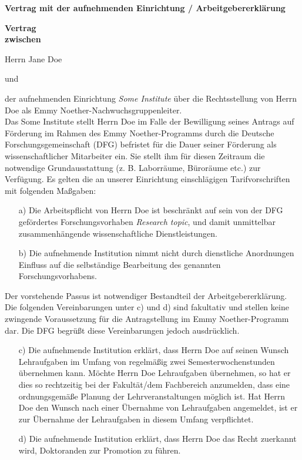 \documentclass[a4paper,10pt,ngerman,numbers=noenddot]{scrreprt}
\newcommand{\firstname}{Jane\xspace}
\newcommand{\lastname}{Doe\xspace}
\newcommand{\institute}{Some Institute\xspace}
\newcommand{\institutearticle}{Das\xspace}
\newcommand{\topic}{Research topic\xspace}
\newcommand{\herrnfrau}{Herrn\xspace}
\newcommand{\seinihr}{sein\xspace}
\newcommand{\ersie}{er\xspace}
\newcommand{\ihmihr}{ihm\xspace}
\newcommand{\employee}{wissenschaftlicher Mitarbeiter\xspace}
\newcommand{\inending}{}
\newcommand{\seinesihres}{seines\xspace}
\newcommand{\seinenihren}{seinen\xspace}
\newcommand{\seinerihrer}{seiner\xspace}
\newcommand{\herrnfrau}{Frau\xspace}
\newcommand{\seinihr}{ihr\xspace}
\newcommand{\ersie}{sie\xspace}
\newcommand{\ihmihr}{ihr\xspace}
\newcommand{\employee}{wissenschaftliche Mitarbeiterin\xspace}
\newcommand{\inending}{in}
\newcommand{\seinesihres}{ihres\xspace}
\newcommand{\seinenihren}{ihren\xspace}
\newcommand{\seinerihrer}{ihrer\xspace}
\begin{document}
\thispagestyle{empty}
\textbf{Vertrag mit der aufnehmenden Einrichtung / Arbeitgebererklärung}\\[0.5cm]

\begin{center}
\bf
Vertrag\\
zwischen
\end{center}

\herrnfrau \firstname \lastname \\

\begin{center}
und\\
\end{center}


der aufnehmenden Einrichtung \emph{\institute} über die Rechtsstellung von \herrnfrau \lastname als Emmy Noether-Nachwuchsgruppenleiter\inending.\\

\institutearticle \institute stellt \herrnfrau \lastname im Falle der Bewilligung \seinesihres Antrags auf Förderung im Rahmen des Emmy Noether-Programms durch die Deutsche Forschungsgemeinschaft (DFG) befristet für die Dauer \seinerihrer Förderung als \employee ein. Sie stellt \ihmihr für diesen Zeitraum die notwendige Grundausstattung (z. B. Laborräume, Büroräume etc.) zur Verfügung. Es gelten die an unserer Einrichtung einschlägigen Tarifvorschriften mit folgenden Maßgaben:

\begin{itemize}
\item[a)]	Die Arbeitspflicht von \herrnfrau \lastname ist beschränkt auf \seinihr von der DFG gefördertes Forschungsvorhaben \emph{\topic}, und damit unmittelbar zu\-sammen\-hängende wissenschaftliche Dienstleistungen.
\item[b)]	Die aufnehmende Institution nimmt nicht durch dienstliche Anordnungen Einfluss auf die selb\-ständige Bearbeitung des genannten Forschungsvorhabens.
\end{itemize}

Der vorstehende Passus ist notwendiger Bestandteil der Arbeitgebererklärung.
Die folgenden Vereinbarungen unter c) und d) sind fakultativ und stellen keine zwingende Voraussetzung für die Antragstellung im Emmy Noether-Programm dar. Die DFG begrüßt diese Vereinbarungen jedoch ausdrücklich.

\begin{itemize}
\item[c)]	Die aufnehmende Institution erklärt, dass \herrnfrau \lastname auf \seinenihren Wunsch Lehraufgaben im Umfang von regelmäßig zwei Semesterwochenstunden übernehmen kann. Möchte \herrnfrau \lastname Lehraufgaben übernehmen, so hat \ersie dies so rechtzeitig bei der Fakultät/dem Fachbereich anzumelden, dass eine ordnungsgemäße Planung der Lehrveranstaltungen möglich ist.
Hat \herrnfrau \lastname den Wunsch nach einer Übernahme von Lehraufgaben angemeldet, ist \ersie zur Übernahme der Lehraufgaben in diesem Umfang verpflichtet.
\item[d)]	Die aufnehmende Institution erklärt, dass \herrnfrau \lastname das Recht zuerkannt wird, Doktoranden zur Promotion zu führen.
\end{itemize}
\end{document}
